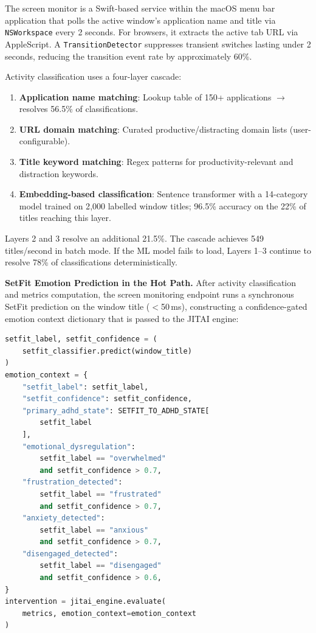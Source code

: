 The screen monitor is a Swift-based service within the macOS menu bar application that polls the active window's application name and title via \texttt{NSWorkspace} every 2 seconds. For browsers, it extracts the active tab URL via AppleScript. A \texttt{TransitionDetector} suppresses transient switches lasting under 2 seconds, reducing the transition event rate by approximately 60\%.

Activity classification uses a four-layer cascade:

\begin{enumerate}[nosep]
  \item \textbf{Application name matching}: Lookup table of 150+ applications $\rightarrow$ resolves 56.5\% of classifications.
  \item \textbf{URL domain matching}: Curated productive/distracting domain lists (user-configurable).
  \item \textbf{Title keyword matching}: Regex patterns for productivity-relevant and distraction keywords.
  \item \textbf{Embedding-based classification}: Sentence transformer with a 14-category model trained on 2{,}000 labelled window titles; 96.5\% accuracy on the 22\% of titles reaching this layer.
\end{enumerate}

Layers 2 and 3 resolve an additional 21.5\%. The cascade achieves 549 titles/second in batch mode. If the ML model fails to load, Layers 1--3 continue to resolve 78\% of classifications deterministically.

\textbf{SetFit Emotion Prediction in the Hot Path.} After activity classification and metrics computation, the screen monitoring endpoint runs a synchronous SetFit prediction on the window title ($<$50\,ms), constructing a confidence-gated emotion context dictionary that is passed to the JITAI engine:

\begin{lstlisting}[language=Python, caption={SetFit emotion prediction and confidence-gated context construction in the screen activity hot path.}, label={lst:emotion-context}]
setfit_label, setfit_confidence = (
    setfit_classifier.predict(window_title)
)
emotion_context = {
    "setfit_label": setfit_label,
    "setfit_confidence": setfit_confidence,
    "primary_adhd_state": SETFIT_TO_ADHD_STATE[
        setfit_label
    ],
    "emotional_dysregulation":
        setfit_label == "overwhelmed"
        and setfit_confidence > 0.7,
    "frustration_detected":
        setfit_label == "frustrated"
        and setfit_confidence > 0.7,
    "anxiety_detected":
        setfit_label == "anxious"
        and setfit_confidence > 0.7,
    "disengaged_detected":
        setfit_label == "disengaged"
        and setfit_confidence > 0.6,
}
intervention = jitai_engine.evaluate(
    metrics, emotion_context=emotion_context
)
\end{lstlisting}

